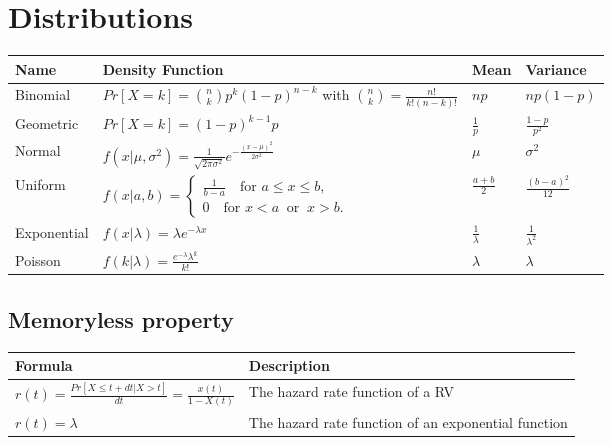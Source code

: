 \documentclass{article}
\begin{document}
\section{Distributions}
\renewcommand{\arraystretch}{2} %
\setlength{\tabcolsep}{8pt}
\begin{longtable}{| p{3cm} | p{7cm} | p{2cm} | p{2cm} |}
    \hline
    \textbf{Name} & \textbf{Density Function} & \textbf{Mean} & \textbf{Variance} \\ \hline
    \endhead
    \hline
    \endfoot
    Binomial & $ Pr[X = k] = \binom{n}{k} p^k(1 - p)^{n-k} $ with $\binom{n}{k} = \frac{n!}{k!(n-k)!} $ & $np$ & $np(1-p)$\\
    \hline
    Geometric & $ Pr[X = k] = (1 - p)^{k-1}p $ & $\frac{1}{p}$ & $ \frac{1-p}{p^2} $\\
    \hline
    Normal & $ f(x|\mu, \sigma^2) = \frac{1}{\sqrt{2 \pi \sigma^2}} e^{-\frac{(x - \mu)^2}{2 \sigma^2}} $ & $\mu$ & $ \sigma^2 $\\
    \hline
    Uniform & $ f(x|a, b) = {\begin{cases}{\frac {1}{b-a}}\quad {\text{for }}a\leq x\leq b,\\[8pt]0 \quad{\text{for }}x<a\ {\text{ or }}\ x>b.\end{cases}} $ & $\frac{a + b}{2} $ & $\frac{(b - a)^2}{12}$ \\
    \hline
    Exponential & $ f(x|\lambda) = \lambda e^{- \lambda x}$ & $\frac{1}{\lambda}$ & $\frac{1}{\lambda^2}$ \\
    \hline
    Poisson & $ f(k|\lambda) = \frac{e^{-\lambda}\lambda^k}{k!}$ & $\lambda$ & $\lambda$ \\
    \hline
\end{longtable}

\subsection{Memoryless property}

\begin{longtable}{| p{7cm} | p{8cm} |}
    \hline
    \textbf{Formula} & \textbf{Description}  \\ \hline
    \endhead
    \hline
    \endfoot
	$ r(t) = \frac{Pr[X \le t +dt | X > t]}{dt} = \frac{x(t)}{1 - X(t)}$ & The hazard rate function of a RV \\
    \hline
    $ r(t) = \lambda $ & The hazard rate function of an exponential function \\
    \hline
\end{longtable}
\end{document}
